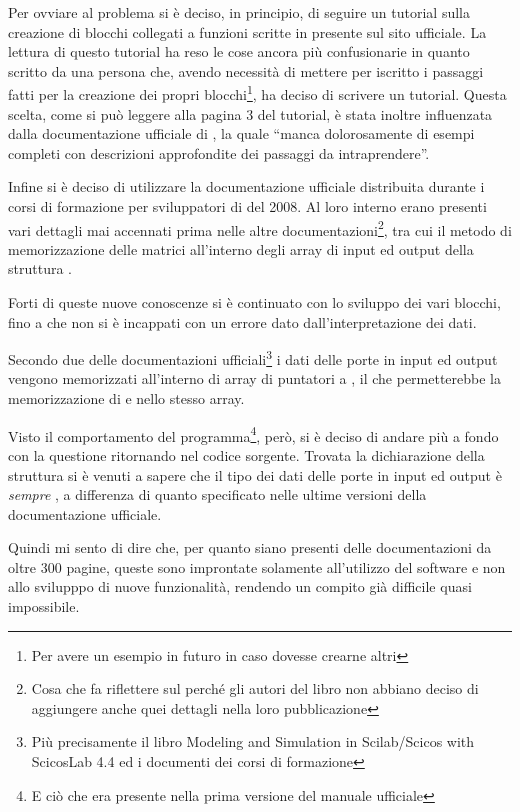 Per ovviare al problema si è deciso, in principio, di seguire un tutorial
sulla creazione di blocchi collegati a funzioni scritte in 
presente sul sito ufficiale\cite{bib:ScicosCTutorial}. La lettura di questo
tutorial ha reso le cose ancora più confusionarie in quanto scritto da una
persona che, avendo necessità di mettere per iscritto i passaggi fatti per
la creazione dei propri blocchi\footnote{Per avere un esempio in futuro in
caso dovesse crearne altri}, ha deciso di scrivere un tutorial. Questa
scelta, come si può leggere alla pagina $3$ del tutorial, è stata inoltre
influenzata dalla documentazione ufficiale di \SciCos{}, la quale
``manca dolorosamente di esempi completi con descrizioni approfondite dei
passaggi da intraprendere''.

Infine si è deciso di utilizzare la documentazione ufficiale distribuita
durante i corsi di formazione per sviluppatori di \SciCos{} del
2008\cite{bib:FormationMars}. Al
loro interno erano presenti vari dettagli mai accennati prima nelle altre
documentazioni\footnote{Cosa che fa riflettere sul perché gli autori del
libro non abbiano deciso di aggiungere anche quei dettagli nella loro
pubblicazione}, tra cui il metodo di memorizzazione delle matrici
all'interno degli array di input ed output della struttura
.

Forti di queste nuove conoscenze si è continuato con lo sviluppo dei vari
blocchi, fino a che non si è incappati con un errore dato
dall'interpretazione dei dati.

Secondo due delle documentazioni ufficiali\footnote{Più precisamente il
libro Modeling and Simulation in Scilab/Scicos with ScicosLab 4.4 ed i
documenti dei corsi di formazione} i dati delle porte in input ed output
vengono memorizzati all'interno di array di puntatori a , il
che permetterebbe la memorizzazione di  e 
nello stesso array.

Visto il comportamento del programma\footnote{E ciò che era presente nella
prima versione del manuale ufficiale}, però, si è deciso di andare più a
fondo con la questione ritornando nel codice sorgente. Trovata la
dichiarazione della struttura si è venuti a sapere che il tipo dei dati
delle porte in input ed output è \emph{sempre} , a
differenza di quanto specificato nelle ultime versioni della documentazione
ufficiale.

Quindi mi sento di dire che, per quanto siano presenti delle documentazioni
da oltre $300$ pagine, queste sono improntate solamente all'utilizzo del
software e non allo svilupppo di nuove funzionalità, rendendo un compito
già difficile quasi impossibile.

\cleardoublepage
